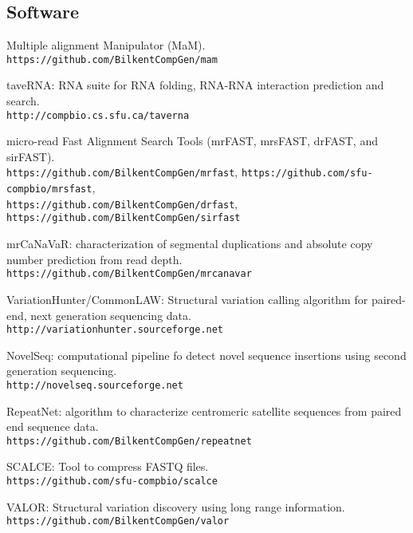 \subsection{\small \sc Software}
\begin{list2}
\item
  Multiple alignment Manipulator (MaM).\\
  {\tt https://github.com/BilkentCompGen/mam}
\item
  taveRNA: RNA suite for RNA folding, RNA-RNA interaction prediction and search.\\
  {\tt http://compbio.cs.sfu.ca/taverna}

\item
  micro-read Fast Alignment Search Tools (mrFAST, mrsFAST, drFAST, and sirFAST).\\
  {\tt https://github.com/BilkentCompGen/mrfast},
  {\tt https://github.com/sfu-compbio/mrsfast},\\
  {\tt https://github.com/BilkentCompGen/drfast},
  {\tt https://github.com/BilkentCompGen/sirfast}
\item
  mrCaNaVaR: characterization of segmental duplications and absolute copy number prediction from read depth.\\
  {\tt https://github.com/BilkentCompGen/mrcanavar}
\item
  VariationHunter/CommonLAW: Structural variation calling algorithm for paired-end, next
  generation sequencing data.\\
  {\tt http://variationhunter.sourceforge.net}
\item
  NovelSeq: computational pipeline fo detect novel sequence insertions using second generation sequencing.\\
  {\tt http://novelseq.sourceforge.net}
\item
  RepeatNet: algorithm to characterize centromeric satellite sequences from paired end sequence data.\\
  {\tt https://github.com/BilkentCompGen/repeatnet}
\item
  SCALCE: Tool to compress FASTQ files. \\
  {\tt https://github.com/sfu-compbio/scalce}
\item
  VALOR: Structural variation discovery using long range information.\\
  {\tt https://github.com/BilkentCompGen/valor}


\end{list2}
